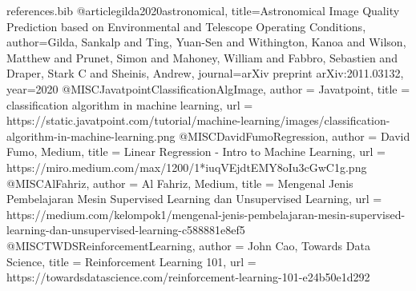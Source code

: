 \begin{filecontents*}{references.bib}
    @article{gilda2020astronomical,
        title={Astronomical Image Quality Prediction based on Environmental and Telescope Operating Conditions},
        author={Gilda, Sankalp and Ting, Yuan-Sen and Withington, Kanoa and Wilson, Matthew and Prunet, Simon and Mahoney, William and Fabbro, Sebastien and Draper, Stark C and Sheinis, Andrew},
        journal={arXiv preprint arXiv:2011.03132},
        year={2020}
    }
    @MISC{JavatpointClassificationAlgImage,
        author = {{Javatpoint}},
        title = {classification algorithm in machine learning},
        url = {https://static.javatpoint.com/tutorial/machine-learning/images/classification-algorithm-in-machine-learning.png}
    }
    @MISC{DavidFumoRegression,
        author = {{David Fumo, Medium}},
        title = {Linear Regression - Intro to Machine Learning},
        url = {https://miro.medium.com/max/1200/1*iuqVEjdtEMY8oIu3cGwC1g.png}
    }
    @MISC{AlFahriz,
        author = {{Al Fahriz, Medium}},
        title = {Mengenal Jenis Pembelajaran Mesin Supervised Learning dan Unsupervised Learning},
        url = {https://medium.com/kelompok1/mengenal-jenis-pembelajaran-mesin-supervised-learning-dan-unsupervised-learning-c588881e8ef5}
    }
    @MISC{TWDSReinforcementLearning,
        author = {{John Cao, Towards Data Science}},
        title = {Reinforcement Learning 101},
        url = {https://towardsdatascience.com/reinforcement-learning-101-e24b50e1d292}
    }
\end{filecontents*}